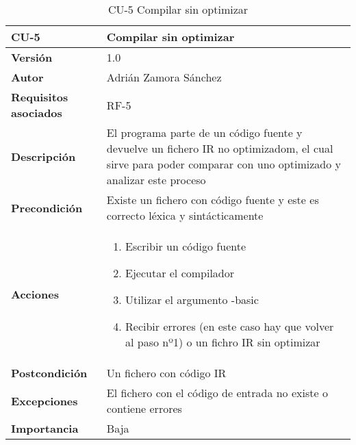 \begin{table}[p]
	\centering
	\begin{tabularx}{\linewidth}{ p{} p{} }
		\toprule
		\textbf{CU-5}    & \textbf{Compilar sin optimizar}\\
		\toprule
		\textbf{Versión}              & 1.0    \\
		\textbf{Autor}                & Adrián Zamora Sánchez \\
		\textbf{Requisitos asociados} & RF-5\\
		\textbf{Descripción}          & El programa parte de un código fuente y devuelve un fichero IR no optimizadom, el cual sirve para poder comparar con uno optimizado y analizar este proceso \\
		\textbf{Precondición}         & Existe un fichero con código fuente y este es correcto léxica y sintácticamente \\
		\textbf{Acciones}             &
		\begin{enumerate}
			\def\labelenumi{\arabic{enumi}.}
			\tightlist
			\item Escribir un código fuente
			\item Ejecutar el compilador
			\item Utilizar el argumento -basic
			\item Recibir errores (en este caso hay que volver al paso nº1) o un fichro IR sin optimizar
		\end{enumerate}\\
		\textbf{Postcondición}        & Un fichero con código IR \\
		\textbf{Excepciones}          & El fichero con el código de entrada no existe o contiene errores \\
		\textbf{Importancia}          & Baja \\ 
		\bottomrule
	\end{tabularx}
	\caption{CU-5 Compilar sin optimizar}
\end{table}